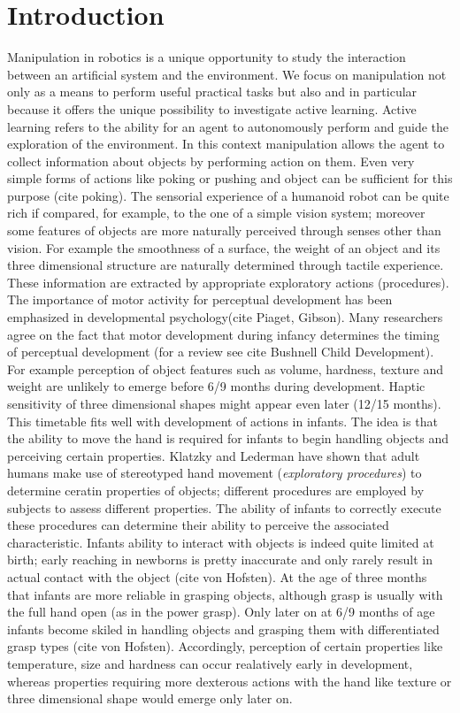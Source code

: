 \section{Introduction}
Manipulation in robotics is a unique opportunity to study the interaction between an artificial system and the environment. We focus on manipulation not only as a means to perform useful practical tasks but also and in particular because it offers the unique possibility to investigate active learning. Active learning refers to the ability for an agent to autonomously perform and guide the exploration of the environment. In this context manipulation allows the agent to collect information about objects by performing action on them. Even very simple forms of actions like poking or pushing and object can be sufficient for this purpose (cite poking).
The sensorial experience of a humanoid robot can be quite rich if compared, for example, to the one of a simple vision system; moreover some features of objects are more naturally perceived through senses other than vision. For example the smoothness of a surface, the weight of an object and its three dimensional structure are naturally determined through tactile experience. These information are extracted by appropriate exploratory actions (procedures).
The importance of motor activity for perceptual development has been emphasized in developmental psychology(cite Piaget, Gibson). Many researchers agree on the fact that motor development during infancy determines the timing of perceptual development (for a review see cite Bushnell Child Development). For example perception of object features such as volume, hardness, texture and weight are unlikely to emerge before 6/9 months during development. Haptic sensitivity of three dimensional shapes might appear even later (12/15 months). This timetable fits well with development of actions in infants. The idea is that the ability to move the hand is required for infants to begin handling objects and perceiving certain properties. Klatzky and Lederman have shown that adult humans make use of stereotyped hand movement (\emph{exploratory procedures}) to determine ceratin properties of objects; different procedures are employed by subjects to assess different properties. The ability of infants to correctly execute these procedures can determine their ability to perceive the associated characteristic. Infants ability to interact with objects is indeed quite limited at birth; early reaching in newborns is pretty inaccurate and only rarely result in actual contact with the object (cite von Hofsten). At the age of three months that infants are more reliable in grasping objects, although grasp is usually with the full hand open (as in the power grasp). Only later on at 6/9 months of age infants become skiled in handling objects and grasping them with differentiated grasp types (cite von Hofsten). Accordingly, perception of certain properties like temperature, size and hardness can occur realatively early in development, whereas properties requiring more dexterous actions with the hand like texture or three dimensional shape would emerge only later on.


